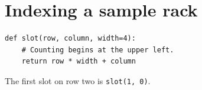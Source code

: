 \documentclass{article}
\begin{document}
\section*{Indexing a sample rack}

\begin{lstlisting}[caption={Number a rectangular rack}]
def slot(row, column, width=4):
    # Counting begins at the upper left.
    return row * width + column
\end{lstlisting}
The first slot on row two is \lstinline|slot(1, 0)|.
\end{document}
